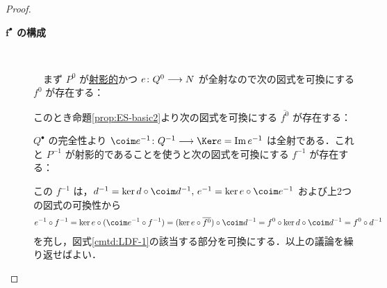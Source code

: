 \documentclass[algtopo_main]{subfiles}
\begin{document}
\begin{proof}
\begin{description}
    \item[\textbf{$\bm{f^\bullet}$ の構成}]　
    
    　まず $P^0$ が\hyperref[def:proj-mod]{射影的}かつ $e \colon Q^0 \longrightarrow N$ が全射なので次の図式を可換にする $f^0$ が存在する：
    \begin{figure}[H]
        \centering
    \end{figure}%
    このとき命題\ref{prop:ES-basic2}より次の図式を可換にする $\overline{f^0}$ が存在する：
    \begin{figure}[H]
        \centering
    \end{figure}%
    $Q^\bullet$ の完全性より $\coim e^{-1} \colon Q^{-1} \lto \Ker e = \Im e^{-1}$ は全射である．これと $P^{-1}$ が射影的であることを使うと次の図式を可換にする $f^{-1}$ が存在する：
    \begin{figure}[H]
        \centering
    \end{figure}%
    この $f^{-1}$ は，$d^{-1} = \ker d \circ \coim d^{-1},\, e^{-1} = \ker e \circ \coim e^{-1}$ および上2つの図式の可換性から
    \begin{align}
        e^{-1} \circ f^{-1} = \ker e \circ (\coim e^{-1} \circ f^{-1}) = (\ker e \circ \overline{f^0}) \circ \coim d^{-1} = f^0 \circ \ker d \circ \coim d^{-1} = f^0 \circ d^{-1}
    \end{align}
    を充し，図式\ref{cmtd:LDF-1}の該当する部分を可換にする．以上の議論を繰り返せばよい．


\end{description}
\end{proof}
\end{document}
